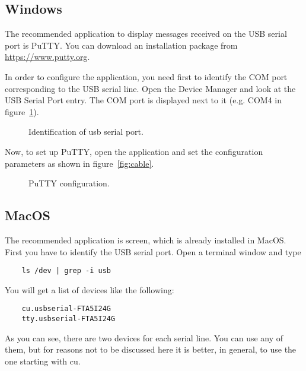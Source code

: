 \subsection{Windows}

The recommended application to display messages received on the USB serial port is PuTTY. You can download an installation package from \url{https://www.putty.org}.

In order to configure the application, you need first to identify the COM port corresponding to the USB serial line. Open the Device Manager and look at the USB Serial Port entry. The COM port is displayed next to it (e.g. COM4 in figure~\ref{fig:com}).

\begin{figure}[hbtp!]
            \caption{Identification of usb serial port.}
            \label{fig:com}
\end{figure}

Now, to set up PuTTY, open the application and set the configuration parameters as shown in figure~\ref{fig:cable}.

\begin{figure}[hbtp!]
            \caption{PuTTY configuration.}
            \label{fig:putty}
\end{figure}

\subsection{MacOS}
The recommended application is screen, which is already installed in MacOS.
First you have to identify the USB serial port. Open a terminal window and type

\begin{BVerbatim}
	ls /dev | grep -i usb
\end{BVerbatim}

You will get a list of devices like the following:

\begin{BVerbatim}
	cu.usbserial-FTA5I24G
	tty.usbserial-FTA5I24G
\end{BVerbatim}

As you can see, there are two devices for each serial line. You can use any of them, but for reasons not to be discussed here it is better, in general, to use the one starting with cu.


